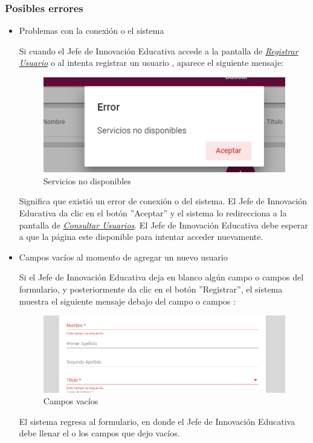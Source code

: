 \subsubsection{Posibles errores}

\begin{itemize}
	\item Problemas con la conexión o el sistema

	Si cuando el Jefe de Innovación Educativa accede a la pantalla de \hyperlink{registrarUs}{\textit{Registrar Usuario}} o al intenta registrar un usuario , aparece el siguiente mensaje:

	\begin{figure}[H]
		\centering
		\includegraphics[width=0.4\linewidth]{images/SP5/MSGSN}
		\caption{Servicios no disponibles}
		\label{SND}

	\end{figure}

	Significa que existió un error de conexión o del sistema. El Jefe de Innovación Educativa da clic en el botón ''Aceptar'' y el sistema lo redirecciona  a la pantalla de \hyperlink{consultarUs}{\textit{Consultar Usuarios}}. El Jefe de Innovación Educativa debe esperar a que la página este disponible para intentar acceder nuevamente.

	\item Campos vacíos al momento de agregar un nuevo usuario

	Si el Jefe de Innovación Educativa deja en blanco algún campo o campos del formulario, y posteriormente da clic en el botón ''Registrar'', el sistema muestra el siguiente mensaje debajo del campo o campos :

	\begin{figure}[H]
		\centering
		\includegraphics[width=0.4\linewidth]{images/SP5/MSG44}
		\caption{Campos vacíos}
		\label{mensaje44}
	\end{figure}

	El sistema regresa al formulario, en donde el Jefe de Innovación Educativa debe llenar el o los campos que dejo vacíos.


\end{itemize}

